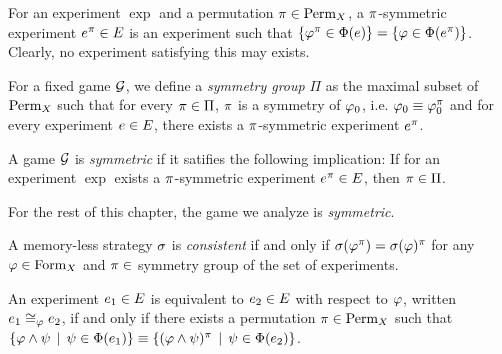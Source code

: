 \newcommand{\symg}{\Pi}

\begin{definition}
For an experiment $\exp$ and a permutation $\pi\in\textrm{Perm}_X$,
  a $\pi$-symmetric experiment $e^\pi\in E$ is an experiment such that
  $\{\varphi^\pi \in\Phi(e)\} = \{\varphi\in\Phi(e^\pi)\}$.
Clearly, no experiment satisfying this may exists.
\end{definition}

\begin{definition}
For a fixed game $\mathcal{G}$, we define a \emph{symmetry group} $\symg$ as
  the maximal subset of $\textrm{Perm}_X$ such that for
  every $\perm\in\symg$, $\pi$ is a symmetry of $\varphi_0$, i.e. $\varphi_0 \equiv \varphi_0^\pi$
  and for every experiment $e\in E$, there exists a $\pi$-symmetric experiment $e^\pi$.
\end{definition}

\begin{definition}
A game $\mathcal{G}$ is \emph{symmetric} if it satifies the following implication:
If for an experiment $\exp$ exists a $\pi$-symmetric experiment $e^\pi\in E$,
  then $\perm\in\symg$.
\end{definition}

For the rest of this chapter, the game we analyze is \emph{symmetric}.

\begin{definition}
A memory-less strategy $\sigma$ is \emph{consistent} if and only if
  $\sigma(\varphi^\pi) = \sigma(\varphi)^\pi$ for any $\varphi\in\textrm{Form}_X$ and
  $\pi\in$ symmetry group of the set of experiments.
\end{definition}


\newcommand{\expeq}[1]{\cong_{#1}}
\begin{definition}
An experiment $e_1\in E$ is equivalent to $e_2\in E$ with respect to $\varphi$,
  written $\exp_1\expeq{\form}\exp_2$,
  if and only if there exists a permutation $\pi\in\textrm{Perm}_X$ such that
 $ \{ \varphi\wedge\psi \:\:|\:\: \psi\in\Phi(e_1) \} \equiv
   \{ (\varphi\wedge\psi)^\pi \:\:|\:\: \psi\in\Phi(e_2) \} $.
\end{definition}

